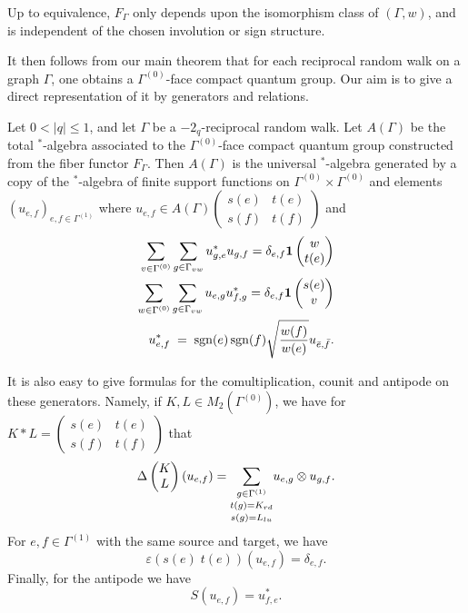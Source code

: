 Up to equivalence, $F_{\Gamma}$ only depends upon the isomorphism class of $(\Gamma,w)$, and is independent of the chosen involution or sign structure.

It then follows from our main theorem that for each reciprocal random walk on a graph $\Gamma$, one obtains a $\Gamma^{(0)}$-face compact quantum group. Our aim is to give a direct representation of it by generators and relations.

\begin{Theorem}\label{TheoGenRel} Let $0<|q|\leq 1$, and let $\Gamma$ be a $-2_q$-reciprocal random walk. Let $A(\Gamma)$ be the total $^*$-algebra associated to the $\Gamma^{(0)}$-face compact quantum group constructed from the fiber functor $F_{\Gamma}$. Then $A(\Gamma)$ is the universal $^*$-algebra generated by a copy of the $^*$-algebra of finite support functions on $\Gamma^{(0)}\times \Gamma^{(0)}$ and elements $(u_{e,f})_{e,f\in \Gamma^{(1)}}$ where $u_{e,f}\in A(\Gamma)\begin{pmatrix} s(e) & t(e)\\ s(f)&t(f)\end{pmatrix}$ and 
\begin{eqnarray*} 
\sum_{v\in \Gamma^{(0)}}\sum_{g\in \Gamma_{vw}} u_{g,e}^*u_{g,f} = \delta_{e,f}\mathbf{1}\begin{pmatrix} w \\ t(e)\end{pmatrix}\\
\sum_{w\in \Gamma^{(0)}} \sum_{g\in \Gamma_{vw}} u_{e,g}u_{f,g}^* = \delta_{e,f} \mathbf{1}\begin{pmatrix} s(e) \\ v\end{pmatrix}\\ 
u_{e,f}^* \;=\; \operatorname{\mathrm{sgn}}(e)\operatorname{\mathrm{sgn}}(f)\sqrt{\frac{w(f)}{w(e)}} u_{\bar{e},\bar{f}}.
\end{eqnarray*} 
\end{Theorem} 

It is also easy to give formulas for the comultiplication, counit and antipode on these generators. Namely, if $K,L  \in M_2(\Gamma^{(0)})$, we have for $K*L = \begin{pmatrix} s(e) & t(e)\\ s(f)& t(f)\end{pmatrix}$ that \[\Delta\begin{pmatrix} K \\ L\end{pmatrix}(u_{e,f}) = \underset{s(g) = L_{lu}}{\underset{t(g) = K_{rd}}{\sum_{g\in\Gamma^{(1)}}}} u_{e,g}\otimes u_{g,f}.\] For $e,f\in \Gamma^{(1)}$ with the same source and target, we have
\[\varepsilon(s(e)\;t(e))(u_{e,f}) = \delta_{e,f}.\]
Finally, for the antipode we have \[S(u_{e,f}) = u_{f,e}^*.\]


